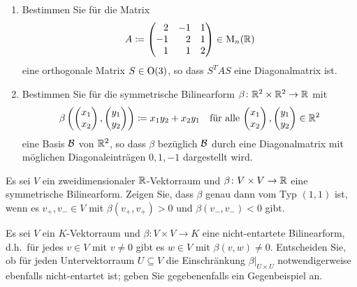 \begin{question}[subtitle = You should be able to solve this]{1}
  \begin{enumerate}[leftmargin=*]
    \item
      Bestimmen Sie für die Matrix
      \[
        A \coloneqq
        \begin{pmatrix*}[r]
           2  & -1  & 1 \\
          -1  &  2  & 1 \\
           1  &  1  & 2
        \end{pmatrix*}
        \in \Mat_n(\Rbb)
      \]
      eine orthogonale Matrix $S \in \operatorname{O}(3)$, so dass $S^T A S$ eine Diagonalmatrix ist.
    \item
      Bestimmen Sie für die symmetrische Bilinearform $\beta \colon \mathbb{R}^2 \times \mathbb{R}^2 \to \mathbb{R}$ mit
      \[
        \beta\left( \begin{pmatrix} x_1 \\ x_2 \end{pmatrix}, \begin{pmatrix} y_1 \\ y_2 \end{pmatrix} \right)
        \coloneqq
        x_1 y_2 + x_2 y_1
        \quad
        \text{für alle $\begin{pmatrix} x_1 \\ x_2 \end{pmatrix}, \begin{pmatrix} y_1 \\ y_2 \end{pmatrix} \in \mathbb{R}^2$}
      \]
      eine Basis $\mathcal{B}$ von $\mathbb{R}^2$, so dass $\beta$ bezüglich $\mathcal{B}$ durch eine Diagonalmatrix mit möglichen Diagonaleinträgen $0, 1, -1$ dargestellt wird.
  \end{enumerate}
\end{question}







\begin{question}[subtitle ={Eine Beschreibung vom Typ $(1,1)$}]{2}
  Es sei $V$ ein zweidimensionaler $\mathbb{R}$-Vektorraum und $\beta \colon V \times V \to \mathbb{R}$ eine symmetrische Bilinearform.
  Zeigen Sie, dass $\beta$ genau dann vom Typ $(1,1)$ ist, wenn es $v_+, v_- \in V$ mit $\beta(v_+, v_+) > 0$ und $\beta(v_-, v_-) < 0$ gibt.
\end{question}


\begin{question}[subtitle = Einschränkung nicht-entarteter Bilinearformen]{2}
  Es sei $V$ ein $K$-Vektorraum und $\beta \colon V \times V \to K$ eine nicht-entartete Bilinearform, d.h.\ für jedes $v \in V$ mit $v \neq 0$ gibt es $w \in V$ mit $\beta(v,w) \neq 0$.
  Entscheiden Sie, ob für jeden Untervektorraum $U \subseteq V$ die Einschränkung $\beta|_{U \times U}$ notwendigerweise ebenfalls nicht-entartet ist; geben Sie gegebenenfalls ein Gegenbeispiel an.
\end{question}


